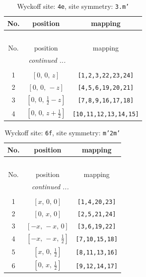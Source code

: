 \documentclass[fleqn,8pt]{jsarticle}
\begin{document}
\renewcommand{\arraystretch}{1.2}
\begin{longtable}{ccc}
\caption{Wyckoff site: {\tt 4e}, site symmetry: {\tt 3.m'}}
 \\
 \hline \hline
No. & position & mapping \\ \hline \endfirsthead

\multicolumn{2}{l}{\tablename\ \thetable{}} \\
 \hline \hline
No. & position & mapping \\ \hline \endhead

 \hline \hline
\multicolumn{2}{r}{\footnotesize\it continued ...} \\ \endfoot

 \hline \hline
\multicolumn{2}{r}{} \\ \endlastfoot

1 & $\left[ 0,\, 0,\, z \right]$ & {\tt [1,2,3,22,23,24]} \\ \hline
2 & $\left[ 0,\, 0,\, - z \right]$ & {\tt [4,5,6,19,20,21]} \\ \hline
3 & $\left[ 0,\, 0,\, \frac{1}{2} - z \right]$ & {\tt [7,8,9,16,17,18]} \\ \hline
4 & $\left[ 0,\, 0,\, z + \frac{1}{2} \right]$ & {\tt [10,11,12,13,14,15]} \\
\end{longtable}
\renewcommand{\arraystretch}{1.2}
\begin{longtable}{ccc}
\caption{Wyckoff site: {\tt 6f}, site symmetry: {\tt m'2m'}}
 \\
 \hline \hline
No. & position & mapping \\ \hline \endfirsthead

\multicolumn{2}{l}{\tablename\ \thetable{}} \\
 \hline \hline
No. & position & mapping \\ \hline \endhead

 \hline \hline
\multicolumn{2}{r}{\footnotesize\it continued ...} \\ \endfoot

 \hline \hline
\multicolumn{2}{r}{} \\ \endlastfoot

1 & $\left[ x,\, 0,\, 0 \right]$ & {\tt [1,4,20,23]} \\ \hline
2 & $\left[ 0,\, x,\, 0 \right]$ & {\tt [2,5,21,24]} \\ \hline
3 & $\left[ - x,\, - x,\, 0 \right]$ & {\tt [3,6,19,22]} \\ \hline
4 & $\left[ - x,\, - x,\, \frac{1}{2} \right]$ & {\tt [7,10,15,18]} \\ \hline
5 & $\left[ x,\, 0,\, \frac{1}{2} \right]$ & {\tt [8,11,13,16]} \\ \hline
6 & $\left[ 0,\, x,\, \frac{1}{2} \right]$ & {\tt [9,12,14,17]} \\
\end{longtable}
\end{document}
